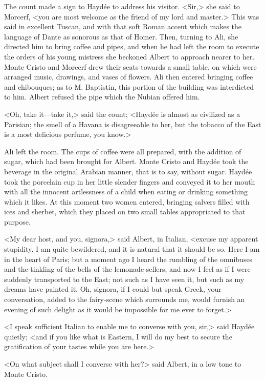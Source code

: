  The count made a sign to Haydée to address his visitor. <Sir,> she said to Morcerf, <you are most welcome as the friend of my lord and master.> This was said in excellent Tuscan, and with that soft Roman accent which makes the language of Dante as sonorous as that of Homer. Then, turning to Ali, she directed him to bring coffee and pipes, and when he had left the room to execute the orders of his young mistress she beckoned Albert to approach nearer to her. Monte Cristo and Morcerf drew their seats towards a small table, on which were arranged music, drawings, and vases of flowers. Ali then entered bringing coffee and chibouques; as to M. Baptistin, this portion of the building was interdicted to him. Albert refused the pipe which the Nubian offered him. 

 <Oh, take it—take it,> said the count; <Haydée is almost as civilized as a Parisian; the smell of a Havana is disagreeable to her, but the tobacco of the East is a most delicious perfume, you know.> 

 Ali left the room. The cups of coffee were all prepared, with the addition of sugar, which had been brought for Albert. Monte Cristo and Haydée took the beverage in the original Arabian manner, that is to say, without sugar. Haydée took the porcelain cup in her little slender fingers and conveyed it to her mouth with all the innocent artlessness of a child when eating or drinking something which it likes. At this moment two women entered, bringing salvers filled with ices and sherbet, which they placed on two small tables appropriated to that purpose. 

 <My dear host, and you, signora,> said Albert, in Italian, <excuse my apparent stupidity. I am quite bewildered, and it is natural that it should be so. Here I am in the heart of Paris; but a moment ago I heard the rumbling of the omnibuses and the tinkling of the bells of the lemonade-sellers, and now I feel as if I were suddenly transported to the East; not such as I have seen it, but such as my dreams have painted it. Oh, signora, if I could but speak Greek, your conversation, added to the fairy-scene which surrounds me, would furnish an evening of such delight as it would be impossible for me ever to forget.> 

 <I speak sufficient Italian to enable me to converse with you, sir,> said Haydée quietly; <and if you like what is Eastern, I will do my best to secure the gratification of your tastes while you are here.> 

 <On what subject shall I converse with her?> said Albert, in a low tone to Monte Cristo. 

